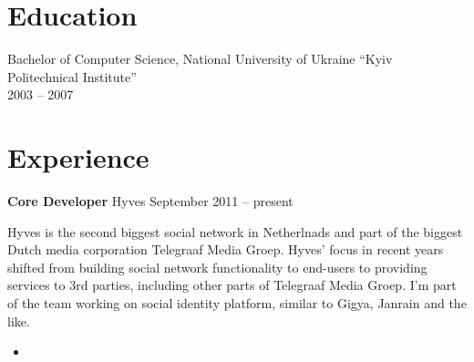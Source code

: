 \documentclass[margin]{res}
\begin{document}

\address{{\bf Address} \\ Mercatorplein 36-K \\ 1056CL, Amsterdam, The Netherlands}

\address{{\bf Contacts} \\ +31 (62) 980-61-41 \\ contact@mishkovskyi.net \\ skype: andriy.mishkovskyy \\ \href{http://mishkovskyi.net}{mishkovskyi.net}}

\begin{resume}


\section{Education}
Bachelor of Computer Science, National University of Ukraine ``Kyiv Politechnical Institute'' \\
2003 -- 2007

\section{Experience}

{\bf Core Developer} Hyves \hfill September 2011 -- present

Hyves is the second biggest social network in Netherlnads and part of the
biggest Dutch media corporation Telegraaf Media Groep. Hyves' focus in recent
years shifted from building social network functionality to end-users to
providing services to 3rd parties, including other parts of Telegraaf Media Groep.
I'm part of the team working on social identity platform, similar to Gigya,
Janrain and the like.

\begin{itemize} \itemsep -1pt
\item
\end{itemize}


\end{resume}
\end{document}

